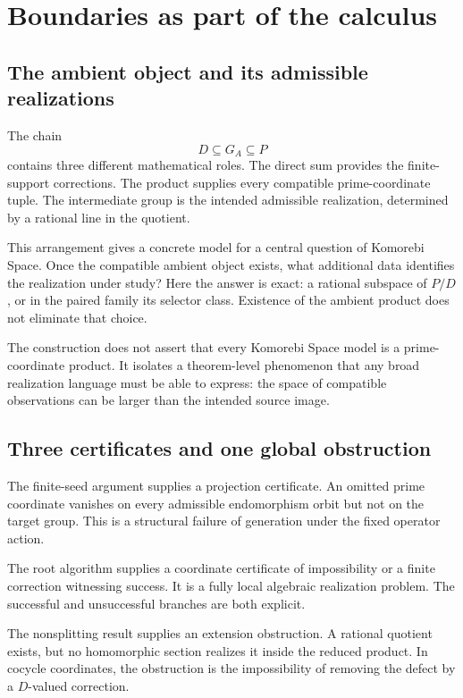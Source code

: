 \chapter{Boundaries as part of the calculus}
\label{ch:calculus}

\section{The ambient object and its admissible realizations}
The chain
\[
D\subseteq G_A\subseteq P
\]
contains three different mathematical roles. The direct sum provides the finite-support corrections. The product supplies every compatible prime-coordinate tuple. The intermediate group is the intended admissible realization, determined by a rational line in the quotient.

This arrangement gives a concrete model for a central question of Komorebi Space. Once the compatible ambient object exists, what additional data identifies the realization under study? Here the answer is exact: a rational subspace of $P/D$, or in the paired family its selector class. Existence of the ambient product does not eliminate that choice.

The construction does not assert that every Komorebi Space model is a prime-coordinate product. It isolates a theorem-level phenomenon that any broad realization language must be able to express: the space of compatible observations can be larger than the intended source image.

\section{Three certificates and one global obstruction}
The finite-seed argument supplies a projection certificate. An omitted prime coordinate vanishes on every admissible endomorphism orbit but not on the target group. This is a structural failure of generation under the fixed operator action.

The root algorithm supplies a coordinate certificate of impossibility or a finite correction witnessing success. It is a fully local algebraic realization problem. The successful and unsuccessful branches are both explicit.

The nonsplitting result supplies an extension obstruction. A rational quotient exists, but no homomorphic section realizes it inside the reduced product. In cocycle coordinates, the obstruction is the impossibility of removing the defect by a $D$-valued correction.

